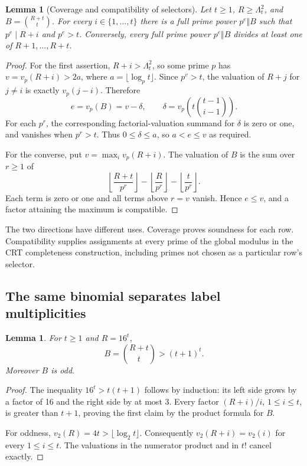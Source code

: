 \documentclass[11pt]{article}
\newtheorem{lemma}[theorem]{Lemma}
\theoremstyle{remark}\newtheorem{remark}[theorem]{Remark}
\begin{document}
\begin{lemma}[Coverage and compatibility of selectors]\label{lem:selectors}
Let $t\ge1$, $R\ge\Lambda_t^2$, and $B=\binom{R+t}{t}$.
For every $i\in\{1,\ldots,t\}$ there is a full prime power
$p^e\Vert B$ such that $p^e\mid R+i$ and $p^e>t$.
Conversely, every full prime power $p^e\Vert B$ divides at least one
of $R+1,\ldots,R+t$.
\end{lemma}
\begin{proof}
For the first assertion, $R+i>\Lambda_t^2$, so some prime $p$ has
$v=v_p(R+i)>2a$, where $a=\lfloor\log_p t\rfloor$. Since $p^v>t$,
the valuation of $R+j$ for $j\ne i$ is exactly $v_p(j-i)$. Therefore
\[
 e=v_p(B)=v-\delta,\qquad
 \delta=v_p\!\left(t\binom{t-1}{i-1}\right).
\]
For each $p^r$, the corresponding factorial-valuation summand for
$\delta$ is zero or one, and vanishes when $p^r>t$.
Thus $0\le\delta\le a$, so $a<e\le v$ as required.

For the converse, put $v=\max_i v_p(R+i)$. The valuation of $B$ is
the sum over $r\ge1$ of
\[
 \left\lfloor\frac{R+t}{p^r}\right\rfloor
 -\left\lfloor\frac R{p^r}\right\rfloor
 -\left\lfloor\frac t{p^r}\right\rfloor.
\]
Each term is zero or one and all terms above $r=v$ vanish. Hence
$e\le v$, and a factor attaining the maximum is compatible.
\end{proof}

The two directions have different uses. Coverage proves soundness for
each row. Compatibility supplies assignments at every prime of the
global modulus in the CRT completeness construction, including primes
not chosen as a particular row's selector.

\subsection{The same binomial separates label multiplicities}

\begin{lemma}\label{lem:binomial-growth}
For $t\ge1$ and $R=16^t$,
\[
 B=\binom{R+t}{t}>(t+1)^t.
\]
Moreover $B$ is odd.
\end{lemma}
\begin{proof}
The inequality $16^t>t(t+1)$ follows by induction: its left side
grows by a factor of 16 and the right side by at most 3. Every factor
$(R+i)/i$, $1\le i\le t$, is greater than $t+1$, proving the first
claim by the product formula for $B$.

For oddness, $v_2(R)=4t>\lfloor\log_2t\rfloor$. Consequently
$v_2(R+i)=v_2(i)$ for every $1\le i\le t$. The valuations in the
numerator product and in $t!$ cancel exactly.
\end{proof}
\end{document}
